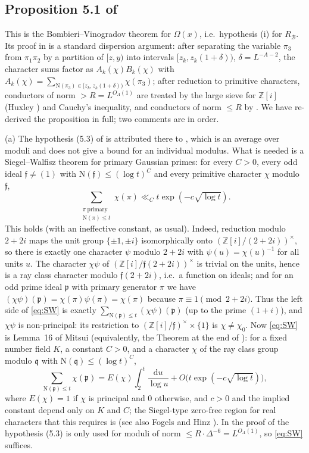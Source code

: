 \documentclass[11pt]{amsart}
\theoremstyle{remark}
\newcommand{\Z}{\mathbb{Z}}
\newcommand{\N}{\mathrm{N}}
\newcommand{\fq}{\mathfrak{q}}
\newcommand{\fp}{\mathfrak{p}}
\newcommand{\Om}{\Omega}
\newcommand{\dd}{\mathrm{d}}
\begin{document}
\subsection{Proposition 5.1 of \cite{IJU}}
This is the Bombieri--Vinogradov theorem for $\Om(x)$, i.e.\ hypothesis (i) for $R_{\mathcal B}$. Its proof in \cite{IJU} is a standard dispersion argument: after separating the variable $\pi_3$ from $\pi_1\pi_2$ by a partition of $[z,y)$ into intervals $[z_k,z_k(1+\delta))$, $\delta=L^{-A-2}$, the character sums factor as $A_k(\chi)B_k(\chi)$ with $A_k(\chi)=\sum_{\N(\pi_3)\in[z_k,z_k(1+\delta))}\chi(\pi_3)$; after reduction to primitive characters, conductors of norm $>R=L^{O_A(1)}$ are treated by the large sieve for $\Z[i]$ \cite[Lemma~5.5]{IJU} (Huxley \cite{Hux68}) and Cauchy's inequality, and conductors of norm $\le R$ by \cite[Lemma~5.2]{IJU}. We have re-derived the proposition in full; two comments are in order.

(a) The hypothesis (5.3) of \cite[Lemma~5.2]{IJU} is attributed there to \cite[Proposition~3.2]{IJU}, which is an average over moduli and does not give a bound for an individual modulus. What is needed is a Siegel--Walfisz theorem for primary Gaussian primes: for every $C>0$, every odd ideal $\mathfrak f\ne(1)$ with $\N(\mathfrak f)\le(\log t)^{C}$ and every primitive character $\chi$ modulo $\mathfrak f$,
\begin{equation}\label{eq:SW}
\sum_{\substack{\pi\ \mathrm{primary}\\ \N(\pi)\le t}}\chi(\pi)\ll_C t\exp(-c\sqrt{\log t}).
\end{equation}
This holds (with an ineffective constant, as usual). Indeed, reduction modulo $2+2i$ maps the unit group $\{\pm1,\pm i\}$ isomorphically onto $(\Z[i]/(2+2i))^\times$, so there is exactly one character $\psi$ modulo $2+2i$ with $\psi(u)=\chi(u)^{-1}$ for all units $u$. The character $\chi\psi$ of $(\Z[i]/\mathfrak f(2+2i))^\times$ is trivial on the units, hence is a ray class character modulo $\mathfrak f(2+2i)$, i.e.\ a function on ideals; and for an odd prime ideal $\fp$ with primary generator $\pi$ we have $(\chi\psi)(\fp)=\chi(\pi)\psi(\pi)=\chi(\pi)$ because $\pi\equiv1\pmod{2+2i}$. Thus the left side of \eqref{eq:SW} is exactly $\sum_{\N(\fp)\le t}(\chi\psi)(\fp)$ (up to the prime $(1+i)$), and $\chi\psi$ is non-principal: its restriction to $(\Z[i]/\mathfrak f)^\times\times\{1\}$ is $\chi\ne\chi_0$. Now \eqref{eq:SW} is Lemma~16 of Mitsui \cite{Mit} (equivalently, the Theorem at the end of \cite[\S1]{Mit}): for a fixed number field $K$, a constant $C>0$, and a character $\chi$ of the ray class group modulo $\fq$ with $\N(\fq)\le(\log t)^{C}$,
\[
\sum_{\N(\fp)\le t}\chi(\fp)=E(\chi)\int_2^t\frac{\dd u}{\log u}+O\bigl(t\exp(-c\sqrt{\log t})\bigr),
\]
where $E(\chi)=1$ if $\chi$ is principal and $0$ otherwise, and $c>0$ and the implied constant depend only on $K$ and $C$; the Siegel-type zero-free region for real characters that this requires is \cite[Lemma~11]{Mit} (see also Fogels \cite{Fog} and Hinz \cite{Hinz}). In the proof of \cite[Proposition~5.1]{IJU} the hypothesis (5.3) is only used for moduli of norm $\le R\cdot\Delta^{-6}=L^{O_A(1)}$, so \eqref{eq:SW} suffices.
\end{document}
